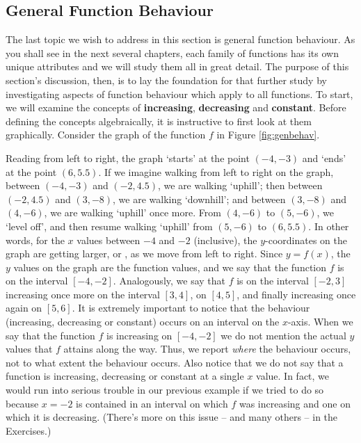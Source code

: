 \medskip

\subsection{General Function Behaviour}
\label{genfuncbehavior}

The last topic we wish to address in this section is general function behaviour.  As you shall see in the next several chapters, each family of functions has its own unique attributes and we will study them all in great detail.  The purpose of this section's discussion, then, is to lay the foundation for that further study by investigating aspects of function behaviour which apply to all functions.  To start, we will examine the concepts of  {\bf increasing},  {\bf decreasing} and  {\bf constant}.  Before defining the concepts algebraically, it is instructive to first look at them graphically.  Consider the graph of the function $f$ in Figure \ref{fig:genbehav}.

Reading from left to right, the graph `starts' at the point $(-4,-3)$ and `ends' at the point $(6,5.5)$.  If we imagine walking from left to right on the graph, between $(-4,-3)$ and $(-2,4.5)$, we are walking `uphill'; then between $(-2,4.5)$ and $(3,-8)$, we are walking `downhill'; and between $(3,-8)$ and $(4,-6)$, we are walking `uphill' once more.  From $(4,-6)$ to $(5, -6)$, we `level off', and then resume walking `uphill' from $(5,-6)$ to $(6,5.5)$.  In other words, for the $x$ values between $-4$ and $-2$ (inclusive), the $y$-coordinates on the graph are getting larger, or  , as we move from left to right.  Since $y = f(x)$, the $y$ values on the graph are the function values, and we say that the function $f$ is  on the interval $[-4,-2]$.  Analogously, we say that $f$ is   on the interval $[-2,3]$ increasing once more on the interval $[3,4]$,   on $[4,5]$, and finally increasing once again on $[5,6]$.  It is extremely important to notice that the behaviour (increasing, decreasing or constant) occurs on an interval on the $x$-axis.  When we say that the function $f$ is increasing on $[-4, -2]$ we do not mention the actual $y$ values that $f$ attains along the way.  Thus, we report \emph{where} the behaviour occurs, not to what extent the behaviour occurs. Also notice that we do not say that a function is increasing, decreasing or constant at a single $x$ value.  In fact, we would run into serious trouble in our previous example if we tried to do so because $x = -2$ is contained in an interval on which $f$ was increasing and one on which it is decreasing.  (There's more on this issue -- and many others -- in the Exercises.) 

